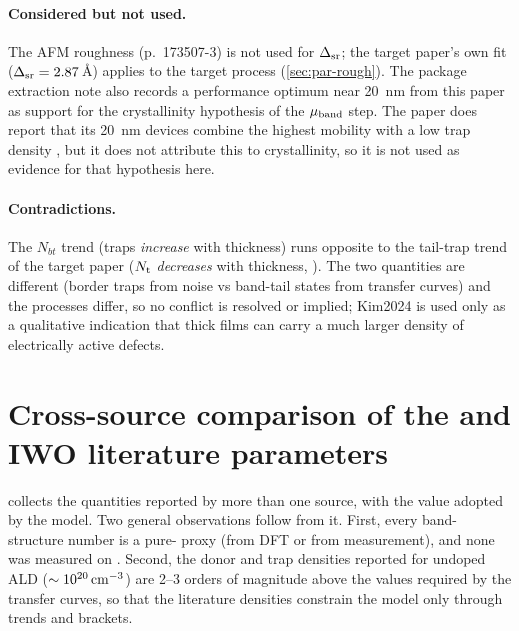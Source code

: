 \paragraph{Considered but not used.}
The AFM roughness (p.~173507-3) is not used for $\Delta_{\mathrm{sr}}$; the target paper's own fit
($\Delta_{\mathrm{sr}} = 2.87$\,\AA) applies to the target process (\cref{sec:par-rough}). The package extraction note
also records a performance optimum near \SI{20}{nm} from this paper as support for the crystallinity
hypothesis of the $\mu_{\mathrm{band}}$ step. The paper does report that its \SI{20}{nm} devices combine the
highest mobility with a low trap density \citep[pp.~173507-1, 173507-6]{Kim2024}, but it does not
attribute this to crystallinity, so it is not used as evidence for that hypothesis here.

\paragraph{Contradictions.}
The $N_{bt}$ trend (traps \emph{increase} with thickness) runs opposite to the tail-trap trend of the
target paper ($N_{\mathrm{t}}$ \emph{decreases} with thickness, \citealp[p.~7]{Januar2026}). The two quantities
are different (border traps from noise vs band-tail states from transfer curves) and the processes
differ, so no conflict is resolved or implied; Kim2024 is used only as a qualitative indication that
thick \IWO{} films can carry a much larger density of electrically active defects.

\section{Cross-source comparison of the \InO{} and IWO literature parameters}
\label{sec:lit-l2-comparison}

 collects the quantities reported by more than one source, with the value
adopted by the model. Two general observations follow from it. First, every band-structure number is a
pure-\InO{} proxy (from DFT or from measurement), and none was measured on \IWO. Second, the donor
and trap densities reported for undoped ALD \InO{} ($\sim10^{20}\,\mathrm{cm}^{-3}$) are 2--3 orders of magnitude
above the values required by the \IWO{} transfer curves, so that the literature densities constrain the
model only through trends and brackets.

